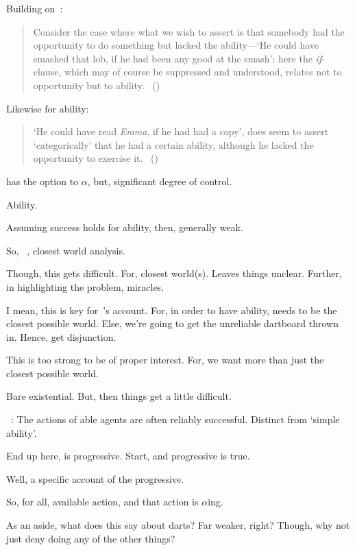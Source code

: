 \begin{note}
  Building on~\citeauthor{Austin:1961vz}:

  \begin{quote}
    Consider the case where what we wish to assert is that somebody had the opportunity to do something but lacked the ability---`He could have smashed that lob, if he had been any good at the smash':
    here the \emph{if}-clause, which may of course be suppressed and understood, relates not to opportunity but to ability.%
    \mbox{ }\hfill\mbox{(\citeyear[177]{Austin:1961vz})}
  \end{quote}
  Likewise for ability:
  \begin{quote}
    `He could have read \emph{Emma}, if he had had a copy', does seem to assert `categorically' that he had a certain ability, although he lacked the opportunity to exercise it.%
    \mbox{ }\hfill\mbox{(\citeyear[177]{Austin:1961vz})}
  \end{quote}
\end{note}

\begin{note}
  has the option to \(\alpha\), but, significant degree of control.
\end{note}

\begin{note}
  Ability.

  Assuming success holds for ability, then, generally weak.

  So, ~\cite{Boylan:2020aa}, closest world analysis.

  Though, this gets difficult.
  For, closest world(s).
  Leaves things unclear.
  Further, in highlighting the problem, miracles.

  I mean, this is key for~\citeauthor{Boylan:2020aa}'s account.
  For, in order to have ability, needs to be the closest possible world.
  Else, we're going to get the unreliable dartboard thrown in.
  Hence, get disjunction.

  This is too strong to be of proper interest.
  For, we want more than just the closest possible world.

  Bare existential.
  But, then things get a little difficult.

  ~\cite{Kikkert:2022wp}: The actions of able agents are often reliably successful.
  Distinct from `simple ability'.
\end{note}

\begin{note}
  End up here, is progressive.
  Start, and progressive is true.

  Well, a specific account of the progressive.

  So, for all, available action, and that action is \(\alpha\)ing.

  As an aside, what does this say about darts?
  Far weaker, right?
  Though, why not just deny doing any of the other things?
\end{note}

